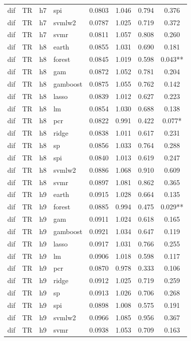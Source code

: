 \begin{ThreePartTable}
\begin{longtable}[t]{llclcccc}
dif & TR & h7 & spi & 0.0803 & 1.046 & 0.794 & 0.376\\
dif & TR & h7 & svmlw2 & 0.0787 & 1.025 & 0.719 & 0.372\\
dif & TR & h7 & svmr & 0.0811 & 1.057 & 0.808 & 0.260\\
\addlinespace
dif & TR & h8 & earth & 0.0855 & 1.031 & 0.690 & 0.181\\
dif & TR & h8 & forest & 0.0845 & 1.019 & 0.598 & 0.043**\\
dif & TR & h8 & gam & 0.0872 & 1.052 & 0.781 & 0.204\\
dif & TR & h8 & gamboost & 0.0875 & 1.055 & 0.762 & 0.142\\
dif & TR & h8 & lasso & 0.0839 & 1.012 & 0.627 & 0.223\\
dif & TR & h8 & lm & 0.0854 & 1.030 & 0.688 & 0.138\\
dif & TR & h8 & pcr & 0.0822 & 0.991 & 0.422 & 0.077*\\
dif & TR & h8 & ridge & 0.0838 & 1.011 & 0.617 & 0.231\\
dif & TR & h8 & sp & 0.0856 & 1.033 & 0.764 & 0.288\\
dif & TR & h8 & spi & 0.0840 & 1.013 & 0.619 & 0.247\\
dif & TR & h8 & svmlw2 & 0.0886 & 1.068 & 0.910 & 0.609\\
dif & TR & h8 & svmr & 0.0897 & 1.081 & 0.862 & 0.365\\
\addlinespace
dif & TR & h9 & earth & 0.0915 & 1.028 & 0.664 & 0.135\\
dif & TR & h9 & forest & 0.0885 & 0.994 & 0.475 & 0.029**\\
dif & TR & h9 & gam & 0.0911 & 1.024 & 0.618 & 0.165\\
dif & TR & h9 & gamboost & 0.0921 & 1.034 & 0.647 & 0.119\\
dif & TR & h9 & lasso & 0.0917 & 1.031 & 0.766 & 0.255\\
dif & TR & h9 & lm & 0.0906 & 1.018 & 0.598 & 0.117\\
dif & TR & h9 & pcr & 0.0870 & 0.978 & 0.333 & 0.106\\
dif & TR & h9 & ridge & 0.0912 & 1.025 & 0.719 & 0.259\\
dif & TR & h9 & sp & 0.0913 & 1.026 & 0.706 & 0.268\\
dif & TR & h9 & spi & 0.0898 & 1.008 & 0.575 & 0.191\\
dif & TR & h9 & svmlw2 & 0.0966 & 1.085 & 0.956 & 0.367\\
dif & TR & h9 & svmr & 0.0938 & 1.053 & 0.709 & 0.163\\

\end{longtable}
\end{ThreePartTable}
